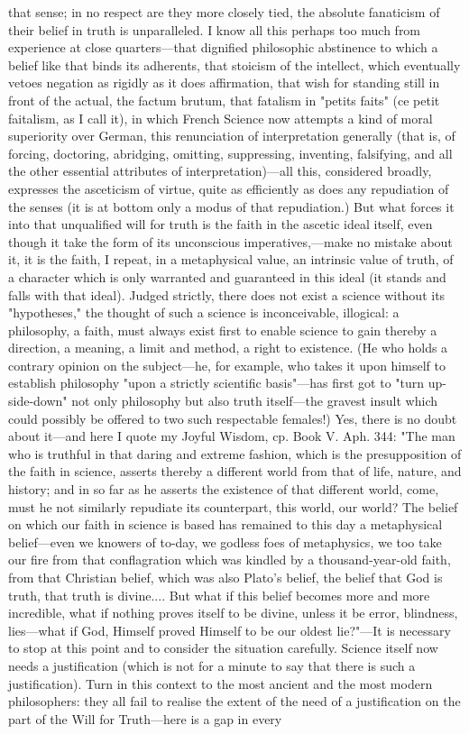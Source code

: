 \documentclass[12pt]{article}
\begin{document}
that sense; in no respect are they more closely tied, the absolute fanaticism of their belief in truth is unparalleled. I know all this perhaps too much from experience at close quarters---that dignified philosophic abstinence to which a belief like that binds its adherents, that stoicism of the intellect, which eventually vetoes negation as rigidly as it does affirmation, that wish for standing still in front of the actual, the factum brutum, that fatalism in "petits faits" (ce petit faitalism, as I call it), in which French Science now attempts a kind of moral superiority over German, this renunciation of interpretation generally (that is, of forcing, doctoring, abridging, omitting, suppressing, inventing, falsifying, and all the other essential attributes of interpretation)---all this, considered broadly, expresses the asceticism of virtue, quite as efficiently as does any repudiation of the senses (it is at bottom only a modus of that repudiation.) But what forces it into that unqualified will for truth is the faith in the ascetic ideal itself, even though it take the form of its unconscious imperatives,---make no mistake about it, it is the faith, I repeat, in a metaphysical value, an intrinsic value of truth, of a character which is only warranted and guaranteed in this ideal (it stands and falls with that ideal). Judged strictly, there does not exist a science without its "hypotheses," the thought of such a science is inconceivable, illogical: a philosophy, a faith, must always exist first to enable science to gain thereby a direction, a meaning, a limit and method, a right to existence. (He who holds a contrary opinion on the subject---he, for example, who takes it upon himself to establish philosophy "upon a strictly scientific basis"---has first got to "turn up-side-down" not only philosophy but also truth itself---the gravest insult which could possibly be offered to two such respectable females!) Yes, there is no doubt about it---and here I quote my Joyful Wisdom, cp. Book V. Aph. 344: "The man who is truthful in that daring and extreme fashion, which is the presupposition of the faith in science, asserts thereby a different world from that of life, nature, and history; and in so far as he asserts the existence of that different world, come, must he not similarly repudiate its counterpart, this world, our world? The belief on which our faith in science is based has remained to this day a metaphysical belief---even we knowers of to-day, we godless foes of metaphysics, we too take our fire from that conflagration which was kindled by a thousand-year-old faith, from that Christian belief, which was also Plato's belief, the belief that God is truth, that truth is divine.... But what if this belief becomes more and more incredible, what if nothing proves itself to be divine, unless it be error, blindness, lies---what if God, Himself proved Himself to be our oldest lie?"---It is necessary to stop at this point and to consider the situation carefully. Science itself now needs a justification (which is not for a minute to say that there is such a justification). Turn in this context to the most ancient and the most modern philosophers: they all fail to realise the extent of the need of a justification on the part of the Will for Truth---here is a gap in every 
\end{document}
